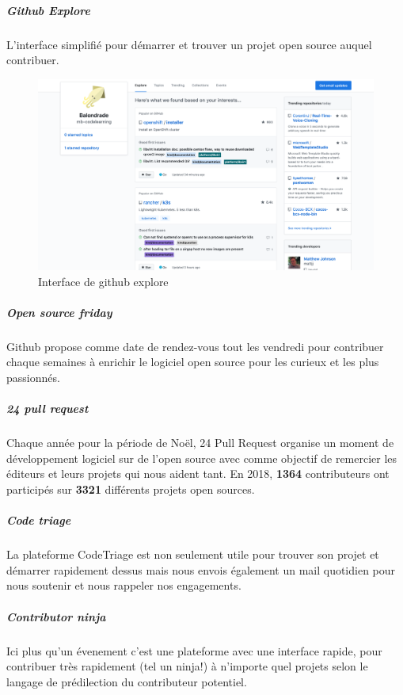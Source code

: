 				\subparagraph{Github Explore\\}
				L'interface simplifié pour démarrer et trouver un projet open source auquel contribuer.

				\begin{figure}[ht]
					\center
					\includegraphics[scale=0.30]{./img/gh_explore_os}
					\caption{Interface de github explore}					
				\end{figure}

				\subparagraph{Open source friday\\}
				Github propose comme date de rendez-vous tout les vendredi pour contribuer chaque semaines à enrichir le logiciel open source pour les curieux et les plus passionnés.

				\subparagraph{24 pull request\\}

				Chaque année pour la période de Noël, 24 Pull Request organise un moment de développement logiciel sur de l'open source avec comme objectif de remercier les éditeurs et leurs projets qui nous aident tant.
				En 2018, \textbf{1364} contributeurs ont participés sur \textbf{3321} différents projets open sources.

				\subparagraph{Code triage\\}

				La plateforme CodeTriage est non seulement utile pour trouver son projet et démarrer rapidement dessus mais nous envois également un mail quotidien pour nous soutenir et nous rappeler nos engagements.

				\subparagraph{Contributor ninja\\}

				Ici plus qu'un évenement c'est une plateforme avec une interface rapide, pour contribuer très rapidement (tel un ninja!) à n'importe quel projets selon le langage de prédilection du contributeur potentiel.

